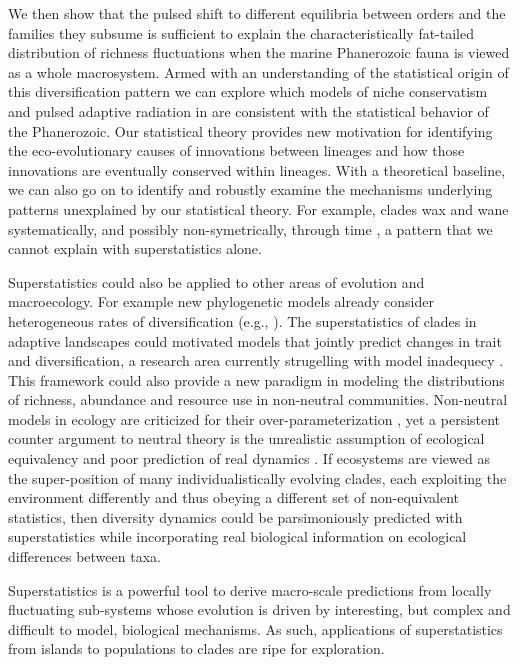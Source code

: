 \documentclass[12pt]{article}
\let\citep=\cite
\begin{document}
We then show that the pulsed shift to different equilibria between
orders and the families they subsume is sufficient to explain the
characteristically fat-tailed distribution of richness fluctuations
when the marine Phanerozoic fauna is viewed as a whole macrosystem.
Armed with an understanding of the statistical origin of this
diversification pattern we can explore which models of niche
conservatism and pulsed adaptive radiation in are consistent with the
statistical behavior of the Phanerozoic. Our statistical theory
provides new motivation for identifying the eco-evolutionary causes of
innovations between lineages and how those innovations are eventually
conserved within lineages. With a theoretical baseline, we can also go
on to identify and robustly examine the mechanisms underlying patterns
unexplained by our statistical theory. For example, clades wax and
wane systematically, and possibly non-symetrically, through time
\citep{liow2007, foote2008paleobiol, quental2013}, a pattern that we
cannot explain with superstatistics alone.

Superstatistics could also be applied to other areas of evolution and
macroecology.  For example new phylogenetic models already consider
heterogeneous rates of diversification (e.g.,
\citep{rabosky2014}). The superstatistics of clades in adaptive
landscapes could motivated models that jointly predict changes in
trait and diversification, a research area currently strugelling with
model inadequecy \citep{rabosky2017fisse}. This framework could also
provide a new paradigm in modeling the distributions of richness,
abundance and resource use in non-neutral communities. Non-neutral
models in ecology are criticized for their over-parameterization
\citep{rosindell2011}, yet a persistent counter argument to neutral
theory \citep{hubbell2001} is the unrealistic assumption of ecological
equivalency \citep{chave2004neutral} and poor prediction of real
dynamics \citep{ricklefs2006neutral}. If ecosystems are viewed as the
super-position of many individualistically evolving clades, each
exploiting the environment differently and thus obeying a different
set of non-equivalent statistics, then diversity dynamics could be
parsimoniously predicted with superstatistics while incorporating real
biological information on ecological differences between taxa.

Superstatistics is a powerful tool to derive macro-scale predictions
from locally fluctuating sub-systems whose evolution is driven by
interesting, but complex and difficult to model, biological
mechanisms. As such, applications of superstatistics from islands to
populations to clades are ripe for exploration.
\end{document}
